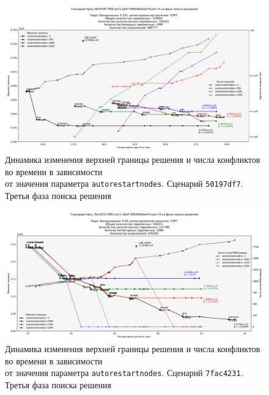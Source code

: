 \documentclass[%
	11pt,
	a4paper,
	utf8,
		]{article}
\begin{document}
\begin{landscape}
\begin{figure}[!h]
	\centering
	\includegraphics[scale=0.63]{figures/50197df7_autorestartnodes.pdf}
	\caption{ Динамика изменения верхней границы решения и числа конфликтов во времени в зависимости \\от значения параметра \texttt{autorestartnodes}. Сценарий \texttt{50197df7}. Третья фаза поиска решения}\label{fig:50197df7_autorestartnodes}
\end{figure}
\end{landscape}

\begin{landscape}
\begin{figure}[!h]
	\centering
	\includegraphics[scale=0.63]{figures/7fac4231_autorestartnodes.pdf}
	\caption{ Динамика изменения верхней границы решения и числа конфликтов во времени в зависимости \\от значения параметра \texttt{autorestartnodes}. Сценарий \texttt{7fac4231}. Третья фаза поиска решения}\label{fig:7fac4231_autorestartnodes}
\end{figure}
\end{landscape}
\end{document}
